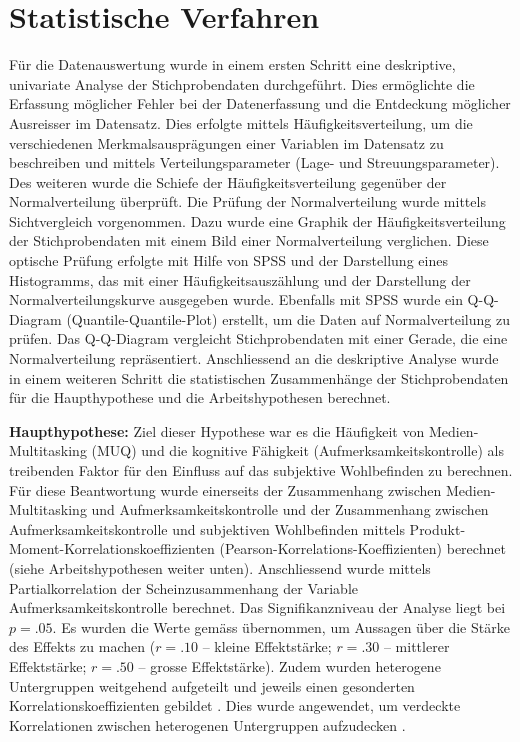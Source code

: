 \section{Statistische Verfahren}\label{section.statistischeVerfahren}
Für die Datenauswertung wurde in einem ersten Schritt eine deskriptive, univariate Analyse der Stichprobendaten durchgeführt. Dies ermöglichte die Erfassung möglicher Fehler bei der Datenerfassung und die Entdeckung möglicher Ausreisser im Datensatz. Dies erfolgte mittels Häufigkeitsverteilung, um die verschiedenen Merkmalsausprägungen einer Variablen im Datensatz zu beschreiben und mittels Verteilungsparameter (Lage- und Streuungsparameter). Des weiteren wurde die Schiefe der Häufigkeitsverteilung gegenüber der Normalverteilung überprüft. Die Prüfung der Normalverteilung wurde mittels Sichtvergleich vorgenommen. Dazu wurde eine Graphik der Häufigkeitsverteilung der Stichprobendaten mit einem Bild einer Normalverteilung verglichen. Diese optische Prüfung erfolgte mit Hilfe von SPSS und der Darstellung eines Histogramms, das mit einer Häufigkeitsauszählung und der Darstellung der Normalverteilungskurve ausgegeben wurde. Ebenfalls mit SPSS wurde ein Q-Q-Diagram (Quantile-Quantile-Plot) erstellt, um die Daten auf Normalverteilung zu prüfen. Das Q-Q-Diagram vergleicht Stichprobendaten mit einer Gerade, die eine Normalverteilung repräsentiert. Anschliessend an die deskriptive Analyse wurde in einem weiteren Schritt die statistischen Zusammenhänge der Stichprobendaten für die Haupthypothese und die Arbeitshypothesen berechnet. 
\par 
\textbf{Haupthypothese:} Ziel dieser Hypothese war es die Häufigkeit von Medien-Multitasking (MUQ) und die kognitive Fähigkeit (Aufmerksamkeitskontrolle) als treibenden Faktor für den Einfluss auf das subjektive Wohlbefinden zu berechnen. Für diese Beantwortung wurde einerseits der Zusammenhang zwischen Medien-Multitasking und Aufmerksamkeitskontrolle und der Zusammenhang zwischen Aufmerksamkeitskontrolle und subjektiven Wohlbefinden mittels Produkt-Moment-Korrelationskoeffizienten (Pearson-Korrelations-Koeffizienten) berechnet (siehe Arbeitshypothesen weiter unten). Anschliessend wurde mittels Partialkorrelation der Scheinzusammenhang der Variable Aufmerksamkeitskontrolle berechnet. Das Signifikanzniveau der Analyse liegt bei $p=.05$. Es wurden die Werte gemäss \cite{Cohen1988} übernommen, um Aussagen über die Stärke des Effekts zu machen ($r=.10$ -- kleine Effektstärke; $r=.30$ -- mittlerer Effektstärke; $r=.50$ -- grosse Effektstärke). Zudem wurden heterogene Untergruppen weitgehend aufgeteilt und jeweils einen gesonderten Korrelationskoeffizienten gebildet \cite{Renkewitz2008}. Dies wurde angewendet, um verdeckte Korrelationen zwischen heterogenen Untergruppen aufzudecken \cite{Ebermann2014}.
